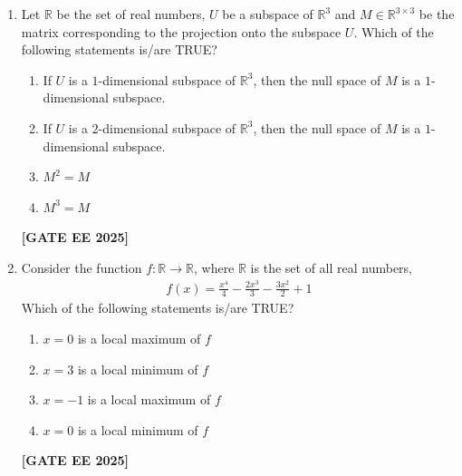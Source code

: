 \documentclass[journal]{IEEEtran}
\newcommand{\qfooter}{%
  \begin{flushright}\footnotesize\textbf{[GATE EE 2025]}\end{flushright}\vspace{1em}%
}
\begin{document}
\begin{enumerate}
\begin{enumerate}
\item There exist $M \in \mathbb{R}^{3\times3}$, $p \in \mathbb{R}^3$, and $q \in \mathbb{R}^3$ such that $M\vec{x}=p$ has a unique solution and $M\vec{x}=q$ has infinite solutions.
\item There exist $M \in \mathbb{R}^{3\times3}$, $p \in \mathbb{R}^3$, and $q \in \mathbb{R}^3$ such that $M\vec{x}=p$ has no solutions and $M\vec{x}=q$ has infinite solutions.
\item There exist $M \in \mathbb{R}^{2\times3}$, $p \in \mathbb{R}^2$, and $q \in \mathbb{R}^2$ such that $M\vec{x}=p$ has a unique solution and $M\vec{x}=q$ has infinite solutions.
\item There exist $M \in \mathbb{R}^{3\times2}$, $p \in \mathbb{R}^3$, and $q \in \mathbb{R}^3$ such that $M\vec{x}=p$ has a unique solution and $M\vec{x}=q$ has no solutions.
\end{enumerate} 
\qfooter

\item Let $\mathbb{R}$ be the set of real numbers, $U$ be a subspace of $\mathbb{R}^3$ and $M \in \mathbb{R}^{3\times 3}$ be the matrix corresponding to the projection onto the subspace $U$. Which of the following statements is/are TRUE?

\begin{enumerate}
\item If $U$ is a $1$-dimensional subspace of $\mathbb{R}^3$, then the null space of $M$ is a $1$-dimensional subspace.
\item If $U$ is a $2$-dimensional subspace of $\mathbb{R}^3$, then the null space of $M$ is a $1$-dimensional subspace.
\item $M^2 = M$
\item $M^3 = M$
\end{enumerate} 
\qfooter


\item Consider the function $f: \mathbb{R} \to \mathbb{R}$, where $\mathbb{R}$ is the set of all real numbers,
\begin{align}
f(x) = \frac{x^4}{4} - \frac{2x^3}{3} - \frac{3x^2}{2} + 1
\end{align}
Which of the following statements is/are TRUE?
\begin{multicols}{2}
\begin{enumerate}
\item $x=0$ is a local maximum of $f$
\item $x=3$ is a local minimum of $f$
\item $x=-1$ is a local maximum of $f$
\item $x=0$ is a local minimum of $f$
\end{enumerate} \qfooter
\end{multicols}



\end{enumerate}
\end{document}
